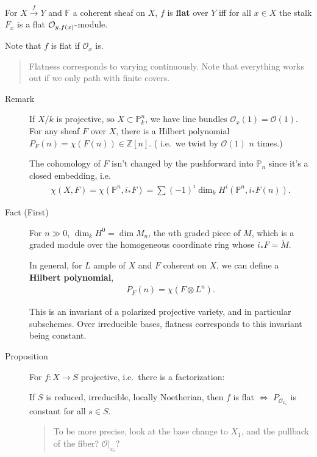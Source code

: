 \begin{description}
\tightlist
\item[Definition (Flatness)]
For \(X \xrightarrow{f} Y\) and \({\mathbb{F}}\) a coherent sheaf on
\(X\), \(f\) is \textbf{flat} over \(Y\) iff for all \(x\in X\) the
stalk \(F_x\) is a flat \({\mathcal{O}}_{y, f(x)}{\hbox{-}}\)module.
\end{description}

Note that \(f\) is flat if \({\mathcal{O}}_x\) is.

\begin{quote}
Flatness corresponds to varying continuously. Note that everything works
out if we only path with finite covers.
\end{quote}

\begin{description}
\item[Remark]
If \(X/k\) is projective, so \(X \subset {\mathbb{P}}^n_k\), we have
line bundles \({\mathcal{O}}_x(1) = {\mathcal{O}}(1)\). For any sheaf
\(F\) over \(X\), there is a Hilbert polynomial
\(P_F(n) = \chi(F(n)) \in {\mathbb{Z}}[n]\). ( i.e.~we twist by
\({\mathcal{O}}(1)\) \(n\) times.)

The cohomology of \(F\) isn't changed by the pushforward into
\({\mathbb{P}}_n\) since it's a closed embedding, i.e.
\begin{align*}
\chi(X, F) = \chi({\mathbb{P}}^n, i_* F) = \sum (-1)^i \dim_k H^i({\mathbb{P}}^n, i_* F(n))
.\end{align*}
\item[Fact (First)]
For \(n \gg 0\), \(\dim_k H^0 = \dim M_n\), the \(n\)th graded piece of
\(M\), which is a graded module over the homogeneous coordinate ring
whose \(i_*F = \tilde M\).

In general, for \(L\) ample of \(X\) and \(F\) coherent on \(X\), we can
define a \textbf{Hilbert polynomial},
\begin{align*}
P_F(n) = \chi(F\otimes L^n)
.\end{align*}

This is an invariant of a polarized projective variety, and in
particular subschemes. Over irreducible bases, flatness corresponds to
this invariant being constant.
\item[Proposition]
For \(f:X\to S\) projective, i.e.~there is a factorization:

\begin{center}
\end{center}

If \(S\) is reduced, irreducible, locally Noetherian, then \(f\) is flat
\(\iff\) \(P_{{\mathcal{O}}_{x_s}}\) is constant for all \(s\in S\).

\begin{quote}
To be more precise, look at the base change to \(X_1\), and the pullback
of the fiber? \({\mathcal{O}}\mathrel{\Big|}_{x_i}\)?
\end{quote}
\end{description}
